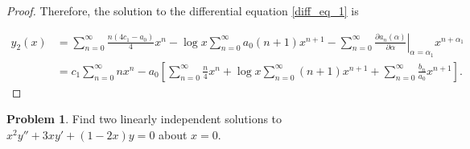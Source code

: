 \documentclass[12pt]{article}
\theoremstyle{definition}
\newtheorem{problem}{Problem}
\begin{document}
\begin{proof}
  Therefore, the solution to the differential equation \eqref{diff_eq_1} is

  \begin{align*}
    y_2(x) &= \sum_{n=0}^\infty\frac{n(4c_1-a_0)}{4}x^n - \log x \sum_{n=0}^\infty a_0(n+1)x^{n+1} - \sum_{n=0}^\infty\left.\frac{\partial a_n(\alpha)}{\partial \alpha}\right|_{\alpha=\alpha_1} x^{n+\alpha_1}\\
    &= c_1\sum_{n=0}^\infty n x^n - a_0 \left[\sum_{n=0}^\infty \frac{n}{4} x^n+ \log x \sum_{n=0}^\infty (n+1)x^{n+1} + \sum_{n=0}^\infty\frac{b_n}{a_0} x ^{n+1}\right].
  \end{align*}
\end{proof}
\newpage


\begin{problem}
  Find two linearly independent solutions to $x^2y'' + 3xy' + (1-2x)y = 0$ about $x=0$.
\end{problem}
\end{document}
